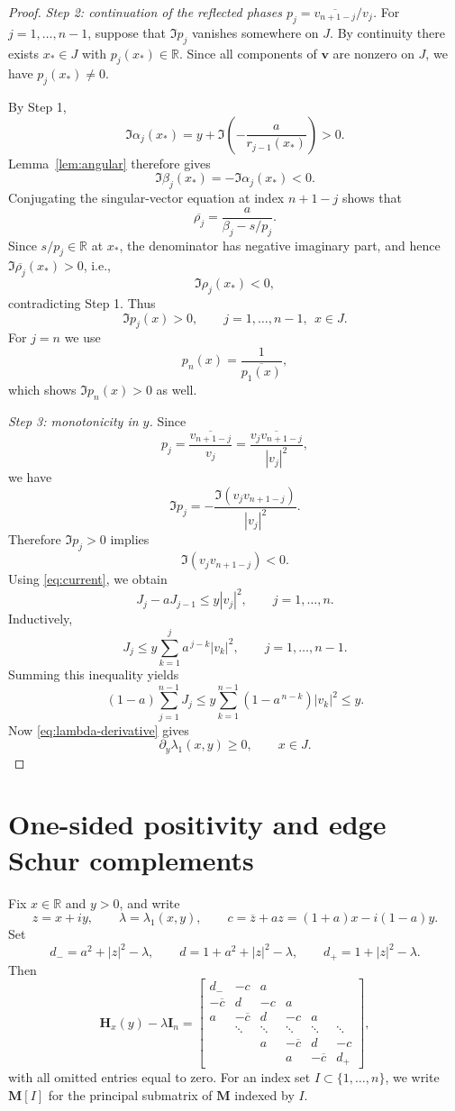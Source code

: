 \documentclass[11pt]{article}
\numberwithin{equation}{section}
\newcommand{\R}{\mathbb R}
\newcommand{\I}{\mathbf I}
\newcommand{\Hmat}{\mathbf H}
\begin{document}
\begin{proof}
\medskip
\noindent
\emph{Step 2: continuation of the reflected phases
\(p_j=\overline{v_{n+1-j}}/v_j\).}
For \(j=1,\dots,n-1\), suppose that \(\Im p_j\) vanishes somewhere on \(J\). By
continuity there exists \(x_*\in J\) with \(p_j(x_*)\in\R\). Since all components of
\(\bm v\) are nonzero on \(J\), we have \(p_j(x_*)\neq0\).

By Step 1,
\[
\Im\alpha_j(x_*)
=
y+\Im\!\left(-\frac{a}{r_{j-1}(x_*)}\right)>0.
\]
Lemma~\ref{lem:angular} therefore gives
\[
\Im\beta_j(x_*)=-\Im\alpha_j(x_*)<0.
\]
Conjugating the singular-vector equation at index \(n+1-j\) shows that
\[
\overline{\rho_j}
=
\frac{a}{\beta_j-s/p_j}.
\]
Since \(s/p_j\in\R\) at \(x_*\), the denominator has negative imaginary part, and
hence \(\Im\overline{\rho_j}(x_*)>0\), i.e.,
\[
\Im\rho_j(x_*)<0,
\]
contradicting Step 1.  Thus
\[
\Im p_j(x)>0,
\qquad
j=1,\dots,n-1,\ \ x\in J.
\]
For \(j=n\) we use
\[
p_n(x)=\frac{1}{\overline{p_1(x)}},
\]
which shows \(\Im p_n(x)>0\) as well.

\medskip
\noindent
\emph{Step 3: monotonicity in \(y\).}
Since
\[
p_j
=
\frac{\overline{v_{n+1-j}}}{v_j}
=
\frac{\overline{v_jv_{n+1-j}}}{|v_j|^2},
\]
we have
\[
\Im p_j
=
-\frac{\Im(v_jv_{n+1-j})}{|v_j|^2}.
\]
Therefore \(\Im p_j>0\) implies
\[
\Im(v_jv_{n+1-j})<0.
\]
Using \eqref{eq:current}, we obtain
\[
J_j-aJ_{j-1}\le y|v_j|^2,
\qquad
j=1,\dots,n.
\]
Inductively,
\[
J_j
\le
y\sum_{k=1}^j a^{\,j-k}|v_k|^2,
\qquad
j=1,\dots,n-1.
\]
Summing this inequality yields
\[
(1-a)\sum_{j=1}^{n-1}J_j
\le
y\sum_{k=1}^{n-1}(1-a^{\,n-k})|v_k|^2
\le y.
\]
Now \eqref{eq:lambda-derivative} gives
\[
\partial_y\lambda_1(x,y)\ge0,
\qquad x\in J.
\]
\end{proof}

\section{One-sided positivity and edge Schur complements}
\label{sec:schur}

Fix \(x\in\R\) and \(y>0\), and write
\[
z=x+iy,
\qquad
\lambda=\lambda_1(x,y),
\qquad
c=\overline z+az=(1+a)x-i(1-a)y.
\]
Set
\[
d_-=a^2+|z|^2-\lambda,
\qquad
d=1+a^2+|z|^2-\lambda,
\qquad
d_+=1+|z|^2-\lambda.
\]
Then
\[
\Hmat_x(y)-\lambda\I_n
=
\begin{bmatrix}
d_- & -c & a \\
-\overline c & d & -c & a \\
a & -\overline c & d & -c & a \\
& \ddots & \ddots & \ddots & \ddots & \ddots \\
&& a & -\overline c & d & -c \\
&&& a & -\overline c & d_+
\end{bmatrix},
\]
with all omitted entries equal to zero.  For an index set
\(I\subset\{1,\dots,n\}\), we write \(\mathbf M[I]\) for the principal submatrix of
\(\mathbf M\) indexed by \(I\).
\end{document}
